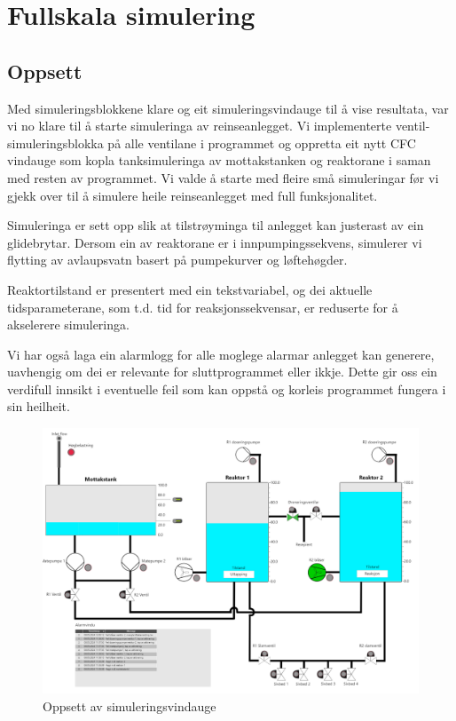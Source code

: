 \section{Fullskala simulering}
\subsection{Oppsett}
Med simuleringsblokkene klare og eit simuleringsvindauge til å vise resultata, var vi
no klare til å starte simuleringa av reinseanlegget.
Vi implementerte ventil-simuleringsblokka på alle ventilane i programmet og oppretta eit
nytt \gls{CFC} vindauge som kopla tanksimuleringa av mottakstanken og reaktorane i saman med resten av
programmet. Vi valde å starte med fleire små simuleringar før vi gjekk over til å simulere heile reinseanlegget med full funksjonalitet.

Simuleringa er sett opp slik at tilstrøyminga til anlegget kan justerast av ein glidebrytar.
Dersom ein av reaktorane er i innpumpingssekvens, simulerer vi flytting av avlaupsvatn
basert på pumpekurver og løftehøgder.

Reaktortilstand er presentert med ein tekstvariabel, og
dei aktuelle tidsparameterane, som t.d. tid for reaksjonssekvensar,
er reduserte for å akselerere simuleringa.

Vi har også laga ein alarmlogg for alle moglege alarmar anlegget kan generere, 
uavhengig om dei er relevante for sluttprogrammet eller ikkje.
Dette gir oss ein verdifull innsikt i eventuelle feil som kan oppstå og korleis programmet fungera i sin heilheit.

\thispagestyle{fancy}
\begin{figure}[htbp]
    \centering
    \includegraphics[scale=0.45]{Bilder/Simuleringsbilde.png}
    \caption{Oppsett av simuleringsvindauge}\label{fig:Simulering}
\end{figure}

